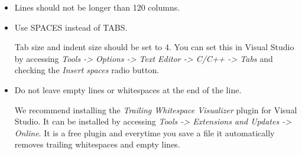 \begin{appendices}
\begin{itemize}
	\item Lines should not be longer than 120 columns.

	\item Use SPACES instead of TABS.

	Tab size and indent size should be set to 4. You can set this in Visual Studio by accessing \textit{Tools -> Options -> Text Editor -> C/C++ -> Tabs} and checking the \textit{Insert spaces} radio button.

	\item Do not leave empty lines or whitespaces at the end of the line.

	We recommend installing the \textit{Trailing Whitespace Visualizer} plugin for Visual Studio. It can be installed by accessing \textit{Tools -> Extensions and Updates -> Online}. It is a free plugin and everytime you save a file it automatically removes trailing whitespaces and empty lines.

\end{itemize}


\end{appendices}